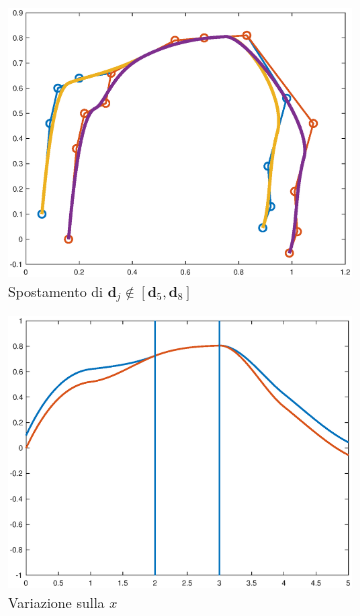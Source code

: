 \documentclass[a4paper, 12pt]{article}
\begin{document}
\begin{figure}[]
  \centering
  \begin{subfigure}[b]{0.3\textwidth}
    \includegraphics[width=\textwidth]{figure/loc6.eps}
    \caption{Spostamento di $\mathbf{d}_j \notin [\mathbf{d}_{5}, \mathbf{d}_{8}]$ }
    \label{fig:loc6}
  \end{subfigure}
  \begin{subfigure}[b]{0.3\textwidth}
      \includegraphics[width=\textwidth]{figure/loc5.eps}
      \caption{Variazione sulla $x$}
      \label{fig:loc5}
  \end{subfigure}
  \begin{subfigure}[b]{0.3\textwidth}

\end{subfigure}
\end{figure}
\end{document}
